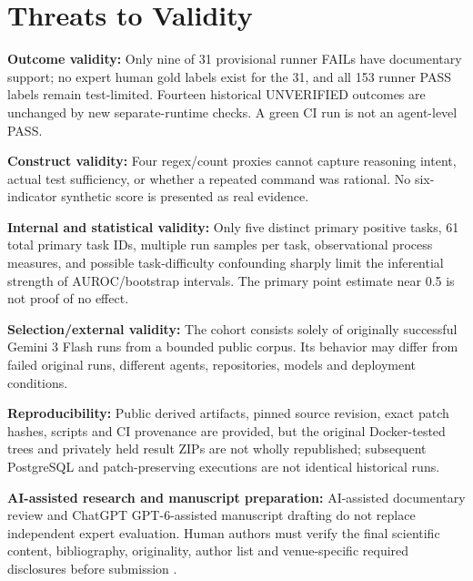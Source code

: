 \documentclass[journal]{IEEEtran}
\begin{document}


\section{Threats to Validity}
\textbf{Outcome validity:} Only nine of 31 provisional runner FAILs have documentary support; no expert human gold labels exist for the 31, and all 153 runner PASS labels remain test-limited. Fourteen historical UNVERIFIED outcomes are unchanged by new separate-runtime checks. A green CI run is not an agent-level PASS.

\textbf{Construct validity:} Four regex/count proxies cannot capture reasoning intent, actual test sufficiency, or whether a repeated command was rational. No six-indicator synthetic score is presented as real evidence.

\textbf{Internal and statistical validity:} Only five distinct primary positive tasks, 61 total primary task IDs, multiple run samples per task, observational process measures, and possible task-difficulty confounding sharply limit the inferential strength of AUROC/bootstrap intervals. The primary point estimate near 0.5 is not proof of no effect.

\textbf{Selection/external validity:} The cohort consists solely of originally successful Gemini 3 Flash runs from a bounded public corpus. Its behavior may differ from failed original runs, different agents, repositories, models and deployment conditions.

\textbf{Reproducibility:} Public derived artifacts, pinned source revision, exact patch hashes, scripts and CI provenance are provided, but the original Docker-tested trees and privately held result ZIPs are not wholly republished; subsequent PostgreSQL and patch-preserving executions are not identical historical runs.

\textbf{AI-assisted research and manuscript preparation:} AI-assisted documentary review and ChatGPT GPT-6-assisted manuscript drafting do not replace independent expert evaluation. Human authors must verify the final scientific content, bibliography, originality, author list and venue-specific required disclosures before submission \cite{baltes2026guidelines}.


\end{document}
